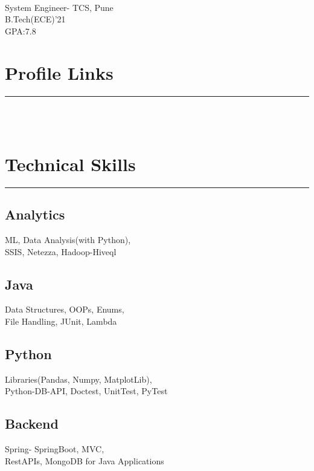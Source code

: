 \documentclass[]{rahulworld-resume}
\begin{document}
%
%

\begin{minipage}[t]{0.33\textwidth} 
\begin{large}
	\\
\end{large}
System Engineer- TCS, Pune\\
B.Tech(ECE)'21\\
GPA:7.8
\section{Profile Links} 
\noindent\rule{5cm}{0.4pt}\\
\href{https://linkedin.com/in/debadrita-debnath-22802580}{}\\
\href{https://github.com/Debadrita1517}{}
\section{Technical Skills}
\noindent\rule{5cm}{0.4pt}
\subsection{Analytics}
ML, Data Analysis(with Python),\\
SSIS, Netezza, Hadoop-Hiveql
\vspace{6pt}
\subsection{Java}
Data Structures, OOPs, Enums,\\
File Handling, JUnit, Lambda
\vspace{6pt}
\subsection{Python}
Libraries(Pandas, Numpy, MatplotLib),\\
Python-DB-API, Doctest, UnitTest, PyTest
\vspace{6pt}
\subsection{Backend}
Spring- SpringBoot, MVC,\\
RestAPIs, MongoDB for Java Applications
\vspace{6pt}

\end{minipage}
\end{document}
